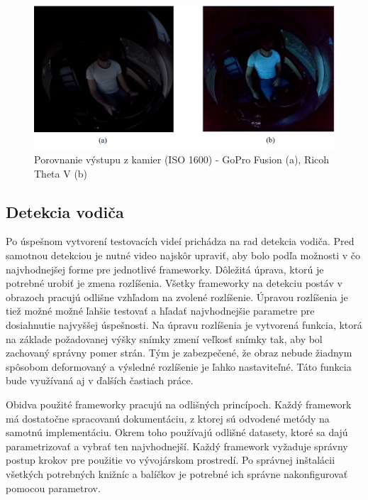 \documentclass[slovak,master,dept460,male,cpp,cpdeclaration]{diploma}
\begin{document}
\begin{figure}[H]
	\centering
	\includegraphics[width=1\textwidth]{Figures/camCompare.png}
	\caption{Porovnanie výstupu z kamier (ISO 1600) - GoPro Fusion (a), Ricoh Theta V (b)}
	\label{fig:cameraCompare}
\end{figure}

\newpage
\subsection{Detekcia vodiča}
\label{sec:driverDetection}
Po úspešnom vytvorení testovacích videí prichádza na rad detekcia vodiča. Pred samotnou detekciou je nutné video najskôr upraviť, aby bolo podľa možnosti v čo najvhodnejšej forme pre jednotlivé frameworky. Dôležitá úprava, ktorú je potrebné urobiť je zmena rozlíšenia. Všetky frameworky na detekciu postáv v obrazoch pracujú odlišne vzhľadom na zvolené rozlíšenie. Úpravou rozlíšenia je tiež možné možné ľahšie testovať a hľadať najvhodnejšie parametre pre dosiahnutie  najvyššej úspešnosti. Na úpravu rozlíšenia je vytvorená funkcia, ktorá na základe požadovanej výšky  snímky  zmení veľkosť  snímky tak, aby bol zachovaný správny pomer strán. Tým je zabezpečené, že obraz nebude žiadnym spôsobom deformovaný a výsledné rozlíšenie je ľahko nastaviteľné. Táto funkcia bude využívaná aj v ďalších častiach práce.\par
Obidva použité frameworky pracujú na odlišných princípoch.  Každý framework má  dostatočne spracovanú dokumentáciu, z ktorej sú odvodené metódy na samotnú implementáciu. Okrem toho používajú odlišné datasety, ktoré sa dajú parametrizovať a vybrať ten najvhodnejší. Každý framework  vyžaduje správny postup krokov pre použitie vo vývojárskom prostredí. Po správnej inštalácii všetkých potrebných knižníc a balíčkov  je potrebné ich správne nakonfigurovať pomocou parametrov.
\end{document}
